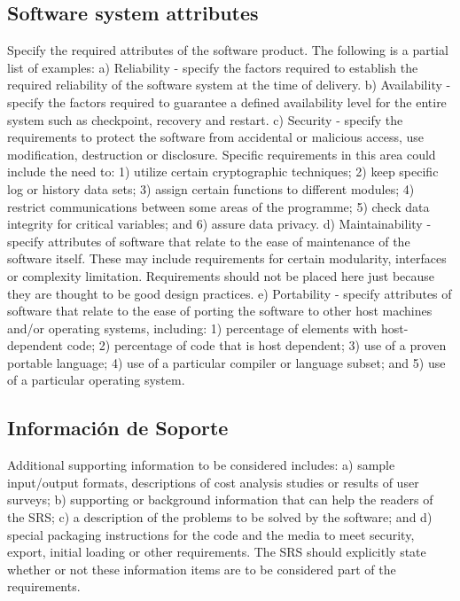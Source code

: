 \documentclass[12pt, a4paper, twoside]{article}
\begin{document}
 \subsection{Software system attributes}
 Specify the required attributes of the software product. The following is a partial list of examples:
 a) Reliability - specify the factors required to establish the required reliability of the software system
 at the time of delivery.
 b) Availability - specify the factors required to guarantee a defined availability level for the entire
 system such as checkpoint, recovery and restart.
 c) Security - specify the requirements to protect the software from accidental or malicious access,
 use modification, destruction or disclosure. Specific requirements in this area could include the
 need to:
 1) utilize certain cryptographic techniques;
 2) keep specific log or history data sets;
 3) assign certain functions to different modules;
 4) restrict communications between some areas of the programme;
 5) check data integrity for critical variables; and
 6) assure data privacy.
 d) Maintainability - specify attributes of software that relate to the ease of maintenance of the
 software itself. These may include requirements for certain modularity, interfaces or complexity
 limitation. Requirements should not be placed here just because they are thought to be good design
 practices.
 e) Portability - specify attributes of software that relate to the ease of porting the software to other
 host machines and/or operating systems, including:
 1) percentage of elements with host-dependent code;
 2) percentage of code that is host dependent;
 3) use of a proven portable language;
 4) use of a particular compiler or language subset; and
 5) use of a particular operating system.

 \subsection{Información de Soporte}
 Additional supporting information to be considered includes:
 a) sample input/output formats, descriptions of cost analysis studies or results of user surveys;
 b) supporting or background information that can help the readers of the SRS;
 c) a description of the problems to be solved by the software; and
 d) special packaging instructions for the code and the media to meet security, export, initial loading
 or other requirements.
 The SRS should explicitly state whether or not these information items are to be considered part of the
 requirements.
\end{document}
